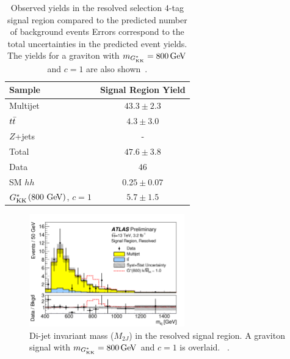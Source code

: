 \begin{table}[!ht]
\captionsetup{justification=centering}
\begin{center}
\begin{tabular}{ l c  }
\toprule
 Sample      & Signal Region Yield \\ 
\midrule
Multijet     & $43.3 \pm 2.3$   \\
$t\bar{t}$       &  $4.3 \pm 3.0$   \\
$Z$+jets     &  -           \\
\midrule
Total        & $47.6 \pm 3.8$   \\
 \midrule
Data         & $46$    \\
\midrule
SM $hh$ & $0.25 \pm 0.07$ \\
$G^*_{\rm KK}$$\left(800\,\rm{\GeV}\right)$, $c = 1$ & $5.7 \pm 1.5$ \\
\bottomrule
\end{tabular}
\caption{Observed yields in the resolved selection $4$-tag signal region compared to the predicted number of background events
  Errors correspond to the total uncertainties in the predicted event yields. The yields for a graviton with $m_{\Gkk} = 800\GeV$ and $c = 1$ are also shown~\cite{4bconf}.}
\label{tab:ResolvedResults} 
\end{center}
\end{table}

\begin{figure}[h!]
  \centering
  \captionsetup{justification=centering}

  \includegraphics[width=0.6\textwidth]{figures/Resolved_signal}


   \caption{Di-jet invariant mass ($M_{2J}$) in the resolved signal region. A graviton signal with $m_{\Gkk} = 800 \GeV$ and $c=1$ is overlaid. ~\cite{4bconf}.}
  \label{fig:ResolvedResults}
\end{figure}

